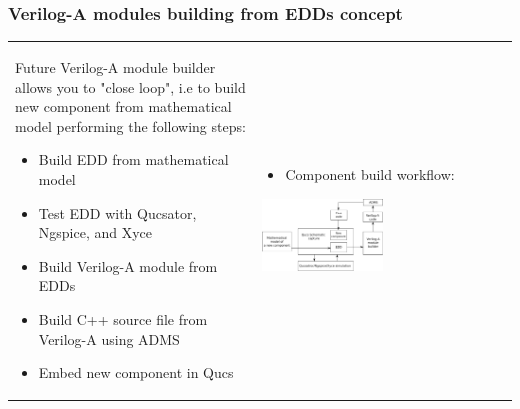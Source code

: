 \documentclass[9pt]{beamer}
\begin{document}
\begin{frame}
 \frametitle{Verilog-A modules building from EDDs concept}

   \begin{tabular}{p{}p{}}
Future Verilog-A module builder allows you to "close loop", i.e to build new 
component from mathematical model performing the following steps:
\begin{itemize}
 \item Build EDD from mathematical model
 \item Test EDD with Qucsator, Ngspice, and Xyce
 \item Build Verilog-A module from EDDs
 \item Build C++ source file from Verilog-A using ADMS
 \item Embed new component in Qucs
\end{itemize}

 & \begin{itemize}
    \item Component build workflow:
   \end{itemize}
   
   \includegraphics[width=0.5\textwidth]{img/verilogA.pdf}
 \\
\end{tabular}




\end{frame}
\end{document}
